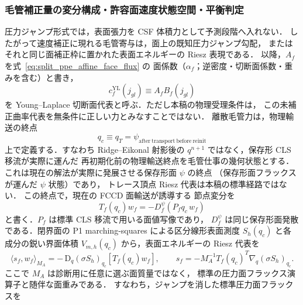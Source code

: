 \subsubsection{毛管補正量の変分構成・許容面速度状態空間・平衡判定}
\label{sec:split_ppe_capillary_range_projection}

圧力ジャンプ形式では，表面張力を CSF 体積力として予測段階へ入れない．
したがって速度補正に現れる毛管寄与は，面上の既知圧力ジャンプ勾配，
またはそれと同じ面補正枠に置かれた表面エネルギーの Riesz 表現である．
以降，$A_f$ を式~\eqref{eq:split_ppe_affine_face_flux} の
面係数（$\alpha_f$；逆密度・切断面係数・重みを含む）と書き，
\begin{equation}
  c_f^{\mathrm{YL}}(j_{gl}) \equiv A_f B_f(j_{gl})
  \label{eq:capillary_jump_face_cochain}
\end{equation}
を Young--Laplace 切断面代表と呼ぶ．ただし本稿の物理受理条件は，
この未補正曲率代表を無条件に正しい力とみなすことではない．
離散毛管力は，物理輸送の終点
\begin{equation}
  q_c \equiv q_T
  =
  \psi_{\mathrm{after\ transport\ before\ reinit}}
  \label{eq:capillary_transport_endpoint}
\end{equation}
上で定義する．すなわち Ridge--Eikonal 射影後の
$q^{n+1}$ ではなく，保存形 CLS 移流が実際に運んだ
再初期化前の物理輸送終点を毛管仕事の幾何状態とする．
これは現在の解法が実際に発展させる保存形面 \(\psi\) の終点
（保存形面フラックスが運んだ \(\psi\) 状態）であり，
トレース頂点 Riesz 代表は本稿の標準経路ではない．
この終点で，現在の FCCD 面輸送が誘導する
節点変分を
\begin{equation}
  T_f(q_c)w_f
  =
  -D_f^\psi\!\left(P_f q_c\,w_f\right)
  \label{eq:capillary_transport_jacobian}
\end{equation}
と書く．$P_f$ は標準 CLS 移流で用いる面値写像であり，
$D_f^\psi$ は同じ保存形面発散である．閉界面の
P1 marching-squares による区分線形表面測度 $S_h(q_c)$ と各成分の鋭い界面体積
$V_{m,h}(q_c)$ から，表面エネルギーの Riesz 代表を
\begin{equation}
  \langle s_f,w_f\rangle_{M_A}
  =
  -\,\mathrm{D}_{q}\!\left(\sigma S_h\right)_{q_c}
     [T_f(q_c)w_f],
  \qquad
  s_f
  =
  -M_A^{-1}T_f(q_c)^{T}\nabla_q\!\left(\sigma S_h\right)_{q_c}.
  \label{eq:capillary_surface_energy_riesz_cochain}
\end{equation}
ここで $M_A$ は診断用に任意に選ぶ面質量ではなく，
標準の圧力面フラックス演算子と随伴な面重みである．
すなわち，ジャンプを消した標準圧力面フラックスを
